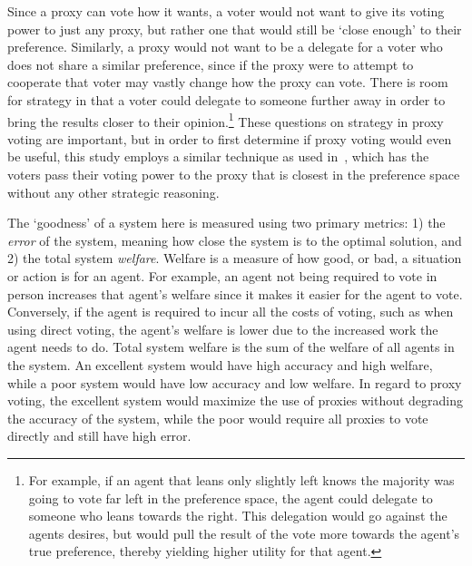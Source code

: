 Since a proxy can vote how it wants, a voter would not want to give its voting power to
just any proxy, but rather one that would still be `close enough' to their preference.
Similarly, a proxy would not want to be a delegate for a voter who does not share a
similar preference, since if the proxy were to attempt to cooperate that voter may
vastly change how the proxy can vote.
There is room for strategy in that a voter could delegate to someone further away in
order to bring the results closer to their opinion.\footnote{
    For example, if an agent that leans only slightly left knows the majority was going
    to vote far left in the preference space, the agent could delegate to someone who
    leans towards the right.
    This delegation would go against the agents desires, but would pull the result of
    the vote more towards the agent's true preference, thereby yielding higher
    utility for that agent.
}
These questions on strategy in proxy voting are important, but in order to first
determine if proxy voting would even be useful, this study employs a similar technique
as used in~\cite{Cohensius2017}, which has the voters pass their voting power to the
proxy that is closest in the preference space without any other strategic reasoning.

The `goodness' of a system here is measured using two primary metrics: 1) the
\textit{error} of the system, meaning how close the system is to the optimal
solution, and 2) the total system \textit{welfare}.
Welfare is a measure of how good, or bad, a situation or action is for an agent.
For example, an agent not being required to vote in person increases that agent's
welfare since it makes it easier for the agent to vote.
Conversely, if the agent is required to incur all the costs of voting, such as when
using direct voting, the agent's welfare is lower due to the increased work the agent
needs to do.
Total system welfare is the sum of the welfare of all agents in the system.
An excellent system would have high accuracy and high welfare, while a poor system
would have low accuracy and low welfare.
In regard to proxy voting, the excellent system would maximize the use of proxies
without degrading the accuracy of the system, while the poor would require all
proxies to vote directly and still have high error.

